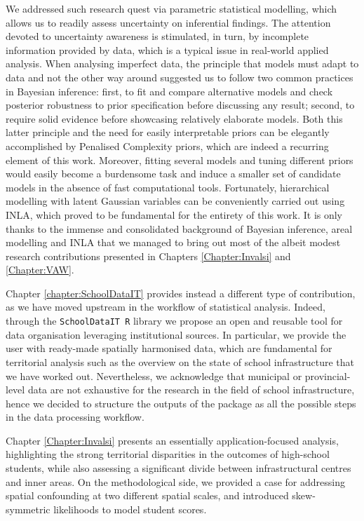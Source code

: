\documentclass[openany, 11pt, oneside]{book}
\begin{document}
We addressed such research quest via parametric statistical modelling, which allows us to readily assess uncertainty on inferential findings. The attention devoted to uncertainty awareness is stimulated, in turn, by incomplete information provided by data, which is a typical issue in real-world applied analysis. When analysing imperfect data, the principle that models must adapt to data and not the other way around suggested us to follow two common practices in Bayesian inference: first, to fit and compare alternative models and check posterior robustness to prior specification before discussing any result; second, to require solid evidence before showcasing relatively elaborate models. Both this latter principle and the need for easily interpretable priors can be elegantly accomplished by Penalised Complexity priors, which are indeed a recurring element of this work. Moreover, fitting several models and tuning different priors would easily become a burdensome task and induce a smaller set of candidate models in the absence of fast computational tools. Fortunately, hierarchical modelling with latent Gaussian variables can be conveniently carried out using INLA, which proved to be fundamental for the entirety of this work. It is only thanks to the immense and consolidated background of Bayesian inference, areal modelling and INLA that we managed to bring out most of the albeit modest research contributions presented in Chapters \ref{Chapter:Invalsi} and \ref{Chapter:VAW}.

Chapter \ref{chapter:SchoolDataIT} provides instead a different type of contribution, as we have moved upstream in the workflow of statistical analysis. Indeed, through the \texttt{SchoolDataIT R} library we propose an open and reusable tool for data organisation leveraging institutional sources. In particular, we provide the user with ready-made spatially harmonised data, which are fundamental for territorial analysis such as the overview on the state of school infrastructure that we have worked out. Nevertheless, we acknowledge that municipal or provincial-level data are not exhaustive for the research in the field of school infrastructure, hence we decided to structure the outputs of the package as all the possible steps in the data processing workflow. 

Chapter \ref{Chapter:Invalsi} presents an essentially application-focused analysis, highlighting the strong territorial disparities in the outcomes of high-school students, while also assessing a significant divide between infrastructural centres and inner areas. On the methodological side, we provided a case for addressing spatial confounding at two different spatial scales, and introduced skew-symmetric likelihoods to model student scores.
\end{document}
